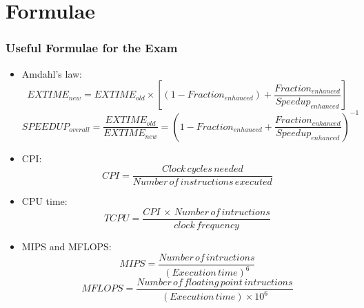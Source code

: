 \documentclass[10pt,a4paper]{article}
\begin{document}
	\clearpage \part{Formulae}
		\section{Useful Formulae for the Exam}
			\begin{itemize}
				\item Amdahl's law: 
					\begin{equation}
						EXTIME_{new} = EXTIME_{old} \times [(1-Fraction_{enhanced}) + \frac{Fraction_{enhanced}}{Speedup_{enhanced}}]
					\end{equation}
					\begin{equation}
						SPEEDUP_{overall} = \frac{EXTIME_{old}}{EXTIME_{new}} = (1-Fraction_{enhanced} + \frac{Fraction_{enhanced}}{Speedup_{enhanced}})^{-1}
					\end{equation}
					
				\item CPI:
					\begin{equation}
						CPI = \frac{Clock\, cycles\, needed}{Number\, of\, instructions\, executed}
					\end{equation}
					
				\item CPU time:
					\begin{equation}
						TCPU = \frac{CPI \,\times\, Number\, of\, intructions}{clock\, frequency}
					\end{equation}
				
				\item MIPS and MFLOPS:
					\begin{equation}
						MIPS = \frac{Number\, of\, intructions}{(Execution\, time)^6}
					\end{equation}
					\begin{equation}
						MFLOPS = \frac{Number\, of\, floating\, point\, intructions}{(Execution\, time)\times 10^6}
					\end{equation}
			\end{itemize}		
\end{document}
